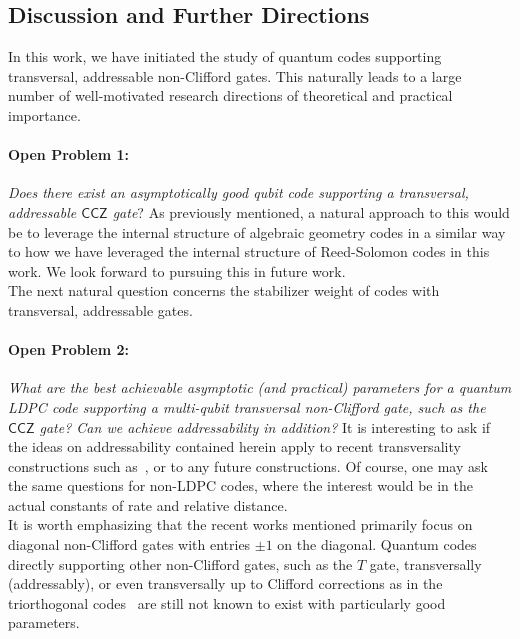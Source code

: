 \documentclass[11pt]{article}
\theoremstyle{definition}
\newcommand{\CCZ}{\mathsf{CCZ}}
\begin{document}
   
    
    \subsection{Discussion and Further Directions}

    In this work, we have initiated the study of quantum codes supporting transversal, addressable non-Clifford gates.
    This naturally leads to a large number of well-motivated research directions of theoretical and practical importance. %
    \paragraph{Open Problem 1:} {\em Does there exist an asymptotically good qubit code supporting a transversal, addressable $\CCZ$ gate}?
    As previously mentioned, a natural approach to this would be to leverage the internal structure of algebraic geometry codes in a similar way to how we have leveraged the internal structure of Reed-Solomon codes in this work. We look forward to pursuing this in future work. 
    \\
    
    The next natural question concerns the stabilizer weight of codes with transversal, addressable gates. 
    \paragraph{Open Problem 2:} {\em What are the best achievable asymptotic (and practical) parameters for a quantum LDPC code supporting a multi-qubit transversal non-Clifford gate, such as the $\CCZ$ gate? Can we achieve addressability in addition?} It is interesting to ask if the ideas on addressability contained herein apply to recent transversality constructions such as~\cite{golowich2024quantum}, or to any future constructions. Of course, one may ask the same questions for non-LDPC codes, where the interest would be in the actual constants of rate and relative distance.
    \\
    
    It is worth emphasizing that the recent works mentioned primarily focus on diagonal non-Clifford gates with entries $\pm 1$ on the diagonal. Quantum codes directly supporting other non-Clifford gates, such as the $T$ gate, transversally (addressably), or even transversally up to Clifford corrections as in the triorthogonal codes~\cite{bravyi2012magic} are still not known to exist with particularly good parameters.
\end{document}
